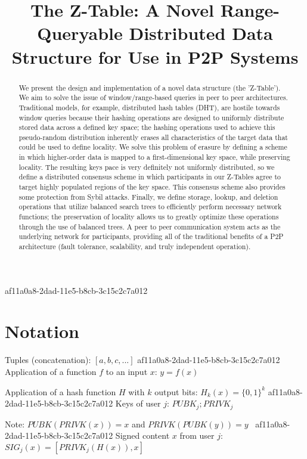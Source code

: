 \documentclass[12pt]{article}
\title{The Z-Table: A Novel Range-Queryable Distributed Data Structure for Use in P2P Systems}
\begin{document}
\maketitle

\begin{abstract}
We present the design and implementation of a novel data structure (the 'Z-Table'). We aim to solve the issue of window/range-based queries in peer to peer architectures. Traditional models, for example,  distributed hash tables (DHT), are hostile towards window queries because their hashing operations are designed to uniformly distribute stored data across a defined key space; the hashing operations used to achieve this pseudo-random distribution inherently erases all characteristics of the target data that could be used to define locality. We solve this problem of erasure by defining a scheme in which higher-order data is mapped to a first-dimensional key space, while preserving locality. The resulting keys pace is very definitely not uniformly distributed, so we define a distributed consensus scheme in which participants in our Z-Tables agree to target highly populated regions of the key space. This consensus scheme also provides some protection from Sybil attacks. Finally, we define storage, lookup, and deletion operations that utilize balanced search trees to efficiently perform necessary network functions; the preservation of locality allows us to greatly optimize these operations through the use of balanced trees. A peer to peer communication system acts as the underlying network for participants, providing all of the traditional benefits of a P2P architecture (fault tolerance, scalability, and truly independent operation).
\end{abstract}

af11a0a8-2dad-11e5-b8cb-3c15c2c7a012\section{Notation}

Tuples (concatenation): $[a,b,c,...]$
af11a0a8-2dad-11e5-b8cb-3c15c2c7a012
Application of a function $f$ to an input $x$: $y=f(x)$

Application of a hash function $H$ with $k$ output bits: $H_{k}(x) = \{0,1\}^k$
af11a0a8-2dad-11e5-b8cb-3c15c2c7a012
Keys of user $j$: $ PUBK_j; PRIVK_j $

Note: $PUBK(PRIVK(x)) = x$ and $PRIVK(PUBK(y)) = y$~
af11a0a8-2dad-11e5-b8cb-3c15c2c7a012
Signed content $x$ from user $j$: $SIG_j(x) = \left[ PRIVK_j( H(x) ), x \right]$
\end{document}
